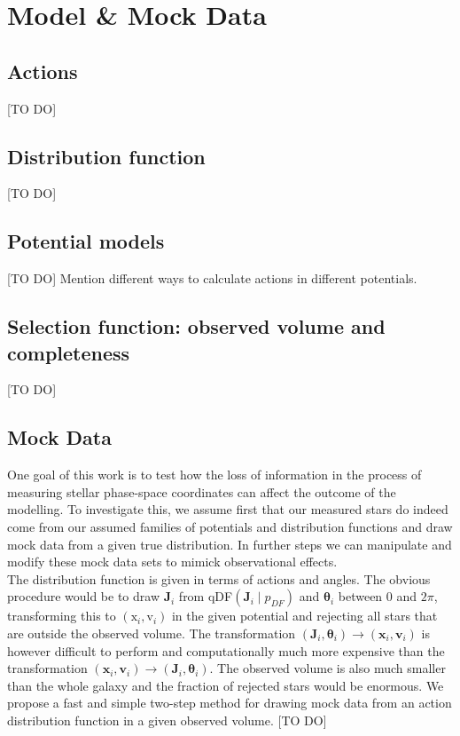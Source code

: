 \documentclass[12pt,preprint]{aastex}
\newcommand{\vect}[1]{\boldsymbol{#1}} %
\begin{document}
\section{Model \& Mock Data}

\subsection{Actions}

[TO DO]


\subsection{Distribution function} \label{sec:qDF}

[TO DO]

\subsection{Potential models}  \label{sec:potentials}

[TO DO] Mention different ways to calculate actions in different potentials.

\subsection{Selection function: observed volume and completeness}

[TO DO]

\subsection{Mock Data}

One goal of this work is to test how the loss of information in the process of measuring stellar phase-space coordinates can affect the outcome of the modelling. To investigate this, we assume first that our measured stars do indeed come from our assumed families of potentials and distribution functions and draw mock data from a given true distribution. In further steps we can manipulate and modify these mock data sets to mimick observational effects.\\
The distribution function is given in terms of actions and angles. The obvious procedure would be to draw $\vect{J}_i$ from qDF$(\vect{J}_i \mid p_{DF})$ and $\vect{\theta}_i$ between 0 and $2\pi$, transforming this to $(\text{x}_i,\text{v}_i)$ in the given potential and rejecting all stars that are outside the observed volume. The transformation $(\vect{J}_i,\vect{\theta}_i) \longrightarrow (\vect{x}_i,\vect{v}_i)$ is however difficult to perform and computationally much more expensive than the transformation $(\vect{x}_i,\vect{v}_i) \longrightarrow (\vect{J}_i,\vect{\theta}_i)$. The observed volume is also much smaller than the whole galaxy and the fraction of rejected stars would be enormous. We propose a fast and simple two-step method for drawing mock data from an action distribution function in a given observed volume.
[TO DO]
\end{document}
